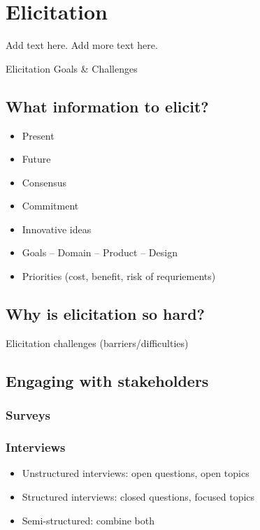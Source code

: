 
\chapter{Elicitation}%
Add text here. Add more text here.


Elicitation Goals \& Challenges%

\section{What information to elicit?}

\begin{itemize}
  \item Present
  \item Future 
  \item Consensus 
  \item Commitment 
  \item Innovative ideas
  \item Goals -- Domain -- Product -- Design
  \item Priorities (cost, benefit, risk of requriements)
\end{itemize}

\section{Why is elicitation so hard?}

Elicitation challenges (barriers/difficulties) 

\section{Engaging with stakeholders}

\subsection{Surveys}

\subsection{Interviews}

\begin{itemize}
\item Unstructured interviews: open questions, open topics
\item Structured interviews: closed questions, focused topics
\item Semi-structured: combine both
\end{itemize}


